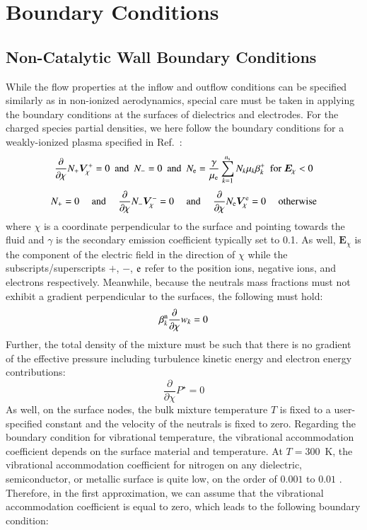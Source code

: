 \documentclass{warpdoc}
\newcommand{\ns}{{n_{\rm s}}}
\renewcommand{\vec}[1]{\bm{#1}}
\begin{document}
\section{Boundary Conditions}

\subsection{Non-Catalytic Wall Boundary Conditions}

While the flow properties at the inflow and outflow conditions can be specified similarly as in non-ionized aerodynamics, special care must be taken in applying the boundary conditions at the surfaces of dielectrics and electrodes. For the charged species partial densities, we here follow the boundary conditions for a weakly-ionized plasma specified in Ref.\ \cite{jcp:2014:parent}:
%
\begin{equation}
\frac{\partial }{\partial \chi} N_+ \vec{V}^{+}_\chi = 0
{~~\rm and~~}
N_{-}=0
{~~\rm and~~}
N_{\rm e}=\frac{\gamma}{\mu_{\rm e}} \sum_{k=1}^\ns N_k \mu_k \beta_k^+
{~~\rm for~}
\vec{E}_\chi<0
\end{equation}
%
%
\begin{equation}
N_{+}=0
{~~~~~\rm and~~~~~}
\frac{\partial }{\partial \chi} N_- \vec{V}^{-}_\chi = 0
{~~~~~\rm and~~~~~}
\frac{\partial }{\partial \chi} N_{\rm e} \vec{V}^{\rm e}_\chi= 0
{~~~~~\rm otherwise} 
\end{equation}
%
where $\chi$ is a coordinate perpendicular to the surface and pointing towards the fluid and $\gamma$ is the secondary emission coefficient typically set to 0.1. As well, $\vec{E}_\chi$ is the component of the electric field in the direction of $\chi$ while the subscripts/superscripts $+$, $-$, $\rm e$ refer to the position ions, negative ions, and electrons respectively. Meanwhile, because the neutrals mass fractions must not exhibit a gradient perpendicular to the surfaces, the following must hold:
%
\begin{equation}
 \beta_k^{\rm n} \frac{\partial }{\partial \chi}w_{k}=0
\end{equation}
%    
Further, the total density of the mixture must be such that there is no gradient of the effective pressure including turbulence kinetic energy and electron energy contributions:
%
\begin{equation}
  \frac{\partial }{\partial \chi}P^\star=0
\end{equation}
%
As well, on the surface nodes, the bulk mixture temperature $T$ is fixed to a user-specified constant and the velocity of the neutrals is fixed to zero. Regarding the boundary condition for vibrational temperature, the vibrational accommodation coefficient depends on the surface material and temperature. At $T=300$~K, the vibrational accommodation coefficient for nitrogen on any dielectric, semiconductor, or metallic surface is quite low, on the order of $0.001$ to $0.01$ \cite{book:1977:Gershenzon,jchemp:1974:black}. Therefore, in the first approximation, we can assume that the vibrational accommodation coefficient is equal to zero, which leads to the following boundary condition:
\end{document}
